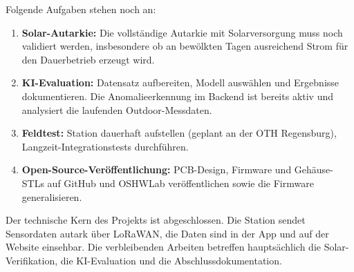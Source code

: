 Folgende Aufgaben stehen noch an:

\begin{enumerate}
  \item \textbf{Solar-Autarkie:} Die vollständige Autarkie mit Solarversorgung muss noch validiert werden, insbesondere ob an bewölkten Tagen ausreichend Strom für den Dauerbetrieb erzeugt wird.

  \item \textbf{KI-Evaluation:} Datensatz aufbereiten, Modell auswählen und Ergebnisse dokumentieren. Die Anomalieerkennung im Backend ist bereits aktiv und analysiert die laufenden Outdoor-Messdaten.

  \item \textbf{Feldtest:} Station dauerhaft aufstellen (geplant an der OTH Regensburg), Langzeit-Integrationstests durchführen.

  \item \textbf{Open-Source-Veröffentlichung:} PCB-Design, Firmware und Gehäuse-STLs auf GitHub und OSHWLab veröffentlichen sowie die Firmware generalisieren.
\end{enumerate}

\noindent Der technische Kern des Projekts ist abgeschlossen. Die Station sendet Sensordaten autark über LoRaWAN, die Daten sind in der App und auf der Website einsehbar. Die verbleibenden Arbeiten betreffen hauptsächlich die Solar-Verifikation, die KI-Evaluation und die Abschlussdokumentation.
